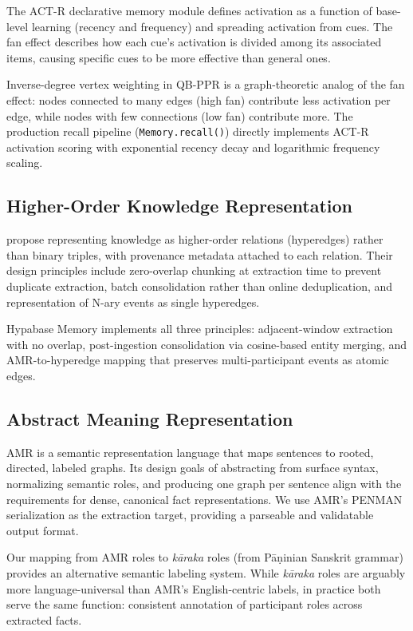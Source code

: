 \documentclass[11pt,a4paper]{article}
\begin{document}
The ACT-R declarative memory module \citep{anderson2004integrated} defines activation as a function of base-level learning (recency and frequency) and spreading activation from cues. The fan effect describes how each cue's activation is divided among its associated items, causing specific cues to be more effective than general ones.

Inverse-degree vertex weighting in QB-PPR is a graph-theoretic analog of the fan effect: nodes connected to many edges (high fan) contribute less activation per edge, while nodes with few connections (low fan) contribute more. The production recall pipeline (\texttt{Memory.recall()}) directly implements ACT-R activation scoring with exponential recency decay and logarithmic frequency scaling.

\subsection{Higher-Order Knowledge Representation}

\citet{stewart2026higher} propose representing knowledge as higher-order relations (hyperedges) rather than binary triples, with provenance metadata attached to each relation. Their design principles include zero-overlap chunking at extraction time to prevent duplicate extraction, batch consolidation rather than online deduplication, and representation of N-ary events as single hyperedges.

Hypabase Memory implements all three principles: adjacent-window extraction with no overlap, post-ingestion consolidation via cosine-based entity merging, and AMR-to-hyperedge mapping that preserves multi-participant events as atomic edges.

\subsection{Abstract Meaning Representation}

AMR \citep{banarescu2013amr} is a semantic representation language that maps sentences to rooted, directed, labeled graphs. Its design goals of abstracting from surface syntax, normalizing semantic roles, and producing one graph per sentence align with the requirements for dense, canonical fact representations. We use AMR's PENMAN serialization as the extraction target, providing a parseable and validatable output format.

Our mapping from AMR roles to \textit{k\=araka} roles (from P\=a\d{n}inian Sanskrit grammar) provides an alternative semantic labeling system. While \textit{k\=araka} roles are arguably more language-universal than AMR's English-centric labels, in practice both serve the same function: consistent annotation of participant roles across extracted facts.
\end{document}
